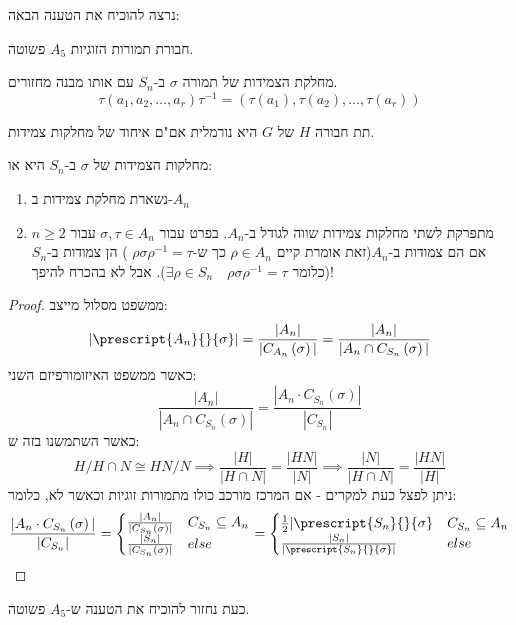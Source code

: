 \documentclass{tstextbook}
\begin{document}
נרצה להוכיח את הטענה הבאה:

\begin{proposition}
חבורת תמורות הזוגיות \(A_{5}\) פשוטה.

\end{proposition}
\begin{reminder}
מחלקת הצמידות של תמורה \(\sigma\) ב-\(S_{n}\) עם אותו מבנה מחזורים.
$$\tau\left( a_{1}, a_{2},\dots,a_{r} \right)\tau ^{-1} =\left( \tau (a_{1}), \tau(a_{2}),\dots,\tau(a_{r})\right)$$

\end{reminder}
\begin{proposition}
תת חבורה \(H\) של \(G\) היא נורמלית אם"ם איחוד של מחלקות צמידות.

\end{proposition}
\begin{proposition}
מחלקות הצמידות של \(\sigma\) ב-\(S_{n}\) היא או:

  \begin{enumerate}
    \item נשארת מחלקת צמידות ב-\(A_{n}\)


    \item מתפרקת לשתי מחלקות צמידות שווה לגודל ב-\(A_{n}\). 
בפרט עבור \(\sigma, \tau \in A_{n}\) עבור \(n\geq 2\) אם הם צמודות ב-\(A_{n}\)(זאת אומרת קיים \(\rho \in A_{n}\) כך ש-\(\rho \sigma \rho ^{-1} =\tau\) ) הן צמודות ב-\(S_{n}\)(כלומר \(\exists \rho \in S_{n}\quad \rho \sigma \rho ^{-1} =\tau\)). אבל לא בהכרח להיפך!


  \end{enumerate}
\end{proposition}
\begin{proof}
ממשפט מסלול מייצב:
$$|\prescript{A_{n}}{}{\sigma}|= \frac{|A_{n}|}{|C_{A_{n}}\left( \sigma \right)|}=\frac{|A_{n}|}{|A_{n}\cap C_{S_{n}}\left( \sigma \right)|}$$
כאשר ממשפט האיזומורפיזם השני:
$$\frac{|A_{n}|}{|A_{n}\cap C_{S_{n}}\left( \sigma \right)|}=\frac{|A_{n}\cdot C_{S_{n}}\left( \sigma \right)|}{|C_{S_{n}}|}$$
כאשר השתמשנו בזה ש:
$$H / H\cap N \cong HN / N \implies \frac{|H|}{|H\cap N|}= \frac{|HN|}{|N|}\implies \frac{|N|}{|H\cap N|}= \frac{|HN|}{|H|}$$
ניתן לפצל כעת למקרים - אם המרכז מורכב כולו מתמורות זוגיות וכאשר לא,
כלומר:
$$\frac{|A_{n}\cdot C_{S_{n}}\left( \sigma \right)|}{|C_{S_{n}}|}=\begin{cases}\frac{|A_{n}|}{|C_{S_{n}}\left( \sigma \right)|} & C_{S_{n}}\subseteq A_{n} \\\frac{|S_{n}|}{|C_{S_{n}}\left( \sigma \right)|} & else\end{cases}=\begin{cases}\frac{1}{2}|\prescript{S_{n}}{}{\sigma} & C_{S_{n}}\subseteq A_{n} \\\frac{|S_{n}|}{| \prescript{S_{n}}{}{\sigma} |} & else
\end{cases}$$

\end{proof}
כעת נחזור להוכיח את הטענה ש-\(A_{5}\) פשוטה.
\end{document}
